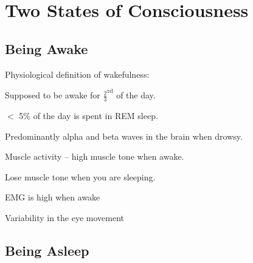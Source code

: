 \section{Two States of Consciousness}

\subsection{Being Awake}

\begin{coloredlist}
    \item Physiological definition of wakefulness:
    \begin{coloredlist}
        \item Supposed to be awake for \(\frac{2}{3}^{\text{rd}}\) of the day.
        \item \(<\) 5\% of the day is spent in REM sleep.
        \item Predominantly alpha and beta waves in the brain when drowsy.
        \item Muscle activity -- high muscle tone when awake.
        \begin{coloredlist}
            \item Lose muscle tone when you are sleeping.
            \begin{coloredlist}
                \item EMG is high when awake
            \end{coloredlist}
        \end{coloredlist}
        \item Variability in the eye movement
    \end{coloredlist}
\end{coloredlist}

\subsection{Being Asleep}

